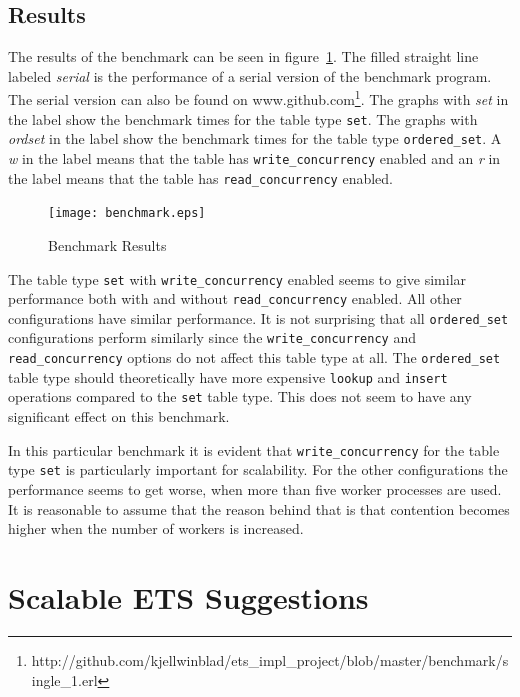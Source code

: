 \documentclass[aps,pre,preprint,nofootinbib]{revtex4}
\begin{document}
\subsection{Results}

The results of the benchmark can be seen in figure~\ref{fig:benchmark_results}.
The filled straight line labeled \emph{serial} is the performance of a serial version of the benchmark program.
The serial version can also be found on www.github.com\footnote{http://github.com/kjellwinblad/ets\_impl\_project/blob/master/benchmark/single\_1.erl}.
The graphs with \emph{set} in the label show the benchmark times for the table type \verb|set|.
The graphs with \emph{ordset} in the label show the benchmark times for the table type \verb|ordered_set|.
A \emph{w} in the label means that the table has \verb|write_concurrency| enabled and an \emph{r} in the label means that the table has \verb|read_concurrency| enabled.

\begin{figure}[htb]
\centering
\texttt{[image: benchmark.eps]}
\caption{Benchmark Results}
\label{fig:benchmark_results}
\end{figure}

The table type \verb|set| with \verb|write_concurrency| enabled seems to give similar performance both with and without \verb|read_concurrency| enabled.
All other configurations have similar performance.
It is not surprising that all \verb|ordered_set| configurations perform similarly since the \verb|write_concurrency| and \verb|read_concurrency| options do not affect this table type at all.
The \verb|ordered_set| table type should theoretically have more expensive \verb|lookup| and \verb|insert| operations compared to the \verb|set| table type.
This does not seem to have any significant effect on this benchmark.

In this particular benchmark it is evident that \verb|write_concurrency| for the table type \verb|set| is particularly important for scalability.
For the other configurations the performance seems to get worse, when more than five worker processes are used.
It is reasonable to assume that the reason behind that is that contention becomes higher when the number of workers is increased.

\section{Scalable ETS Suggestions}
\end{document}
